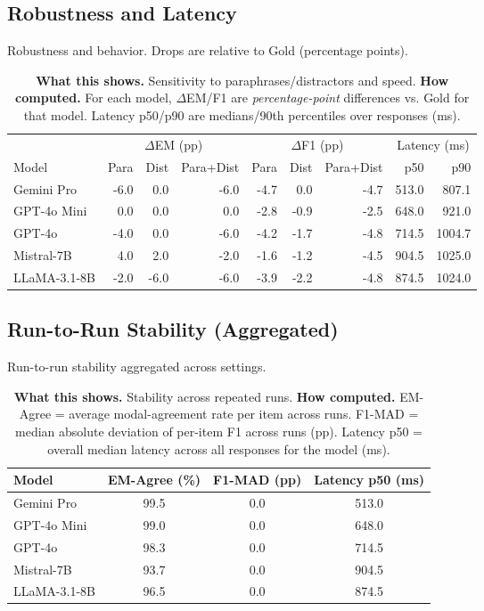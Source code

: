 \subsection{Robustness and Latency}
\begin{table}[H]\centering
\caption{Robustness and behavior. Drops are relative to Gold (percentage points).}
\label{tab:robustness-behavior}
\scriptsize
\setlength{\tabcolsep}{4pt}
\renewcommand{\arraystretch}{1.05}
\begin{tabular}{l rrr rrr rr}
\toprule
& \multicolumn{3}{c}{\(\Delta\)EM (pp)} & \multicolumn{3}{c}{\(\Delta\)F1 (pp)} & \multicolumn{2}{c}{Latency (ms)} \\
\cmidrule(lr){2-4}\cmidrule(lr){5-7}\cmidrule(lr){8-9}
Model & Para & Dist & Para+Dist & Para & Dist & Para+Dist & p50 & p90 \\
\midrule
Gemini Pro & -6.0 & 0.0 & -6.0 & -4.7 & 0.0 & -4.7 & 513.0 & 807.1 \\
GPT-4o Mini & 0.0 & 0.0 & 0.0 & -2.8 & -0.9 & -2.5 & 648.0 & 921.0 \\
GPT-4o & -4.0 & 0.0 & -6.0 & -4.2 & -1.7 & -4.8 & 714.5 & 1004.7 \\
Mistral-7B & 4.0 & 2.0 & -2.0 & -1.6 & -1.2 & -4.5 & 904.5 & 1025.0 \\
LLaMA-3.1-8B & -2.0 & -6.0 & -6.0 & -3.9 & -2.2 & -4.8 & 874.5 & 1024.0 \\
\bottomrule
\end{tabular}
\caption*{\scriptsize
\textbf{What this shows.} Sensitivity to paraphrases/distractors and speed.\;
\textbf{How computed.} For each model, $\Delta$EM/F1 are \emph{percentage-point} differences vs. Gold for that model. Latency p50/p90 are medians/90th percentiles over responses (ms).}
\end{table}

\subsection{Run-to-Run Stability (Aggregated)}
\begin{table}[H]\centering
\caption{Run-to-run stability aggregated across settings.}
\label{tab:stability}
\small
\setlength{\tabcolsep}{5pt}
\renewcommand{\arraystretch}{1.05}
\begin{tabular}{lccc}
\toprule
Model & EM-Agree (\%) & F1-MAD (pp) & Latency p50 (ms) \\
\midrule
Gemini Pro & 99.5 & 0.0 & 513.0 \\
GPT-4o Mini & 99.0 & 0.0 & 648.0 \\
GPT-4o & 98.3 & 0.0 & 714.5 \\
Mistral-7B & 93.7 & 0.0 & 904.5 \\
LLaMA-3.1-8B & 96.5 & 0.0 & 874.5 \\
\bottomrule
\end{tabular}
\caption*{\scriptsize
\textbf{What this shows.} Stability across repeated runs.\;
\textbf{How computed.} EM-Agree = average modal-agreement rate per item across runs. 
F1-MAD = median absolute deviation of per-item F1 across runs (pp). 
Latency p50 = overall median latency across all responses for the model (ms).}
\end{table}

